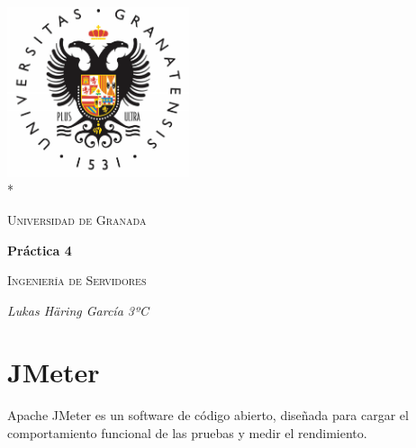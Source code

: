 \documentclass[12pt,a4paper]{article}
\date{\specialdate\today}
\begin{document}
	\begin{titlepage}
		\centering
		\includegraphics[width=0.4\textwidth]{logo-ugr.png}\\*
		{\scshape\LARGE Universidad de Granada \par}
		{\large \date{\specialdate\today}\par}
		\vspace{1cm}
		{\LARGE\bfseries Práctica 4\par}
		\vspace{1.5cm}
		{\scshape\large Ingeniería de Servidores\par}
		\vspace{2cm}
		{\Large\itshape Lukas Häring García 3ºC\par}
	\end{titlepage}
	
	\tableofcontents
	
	\newpage
	
	
	
	
	
	\section{JMeter}
	Apache JMeter es un software de código abierto, diseñada para cargar el comportamiento funcional de las pruebas y medir el rendimiento.
	
\end{document}
